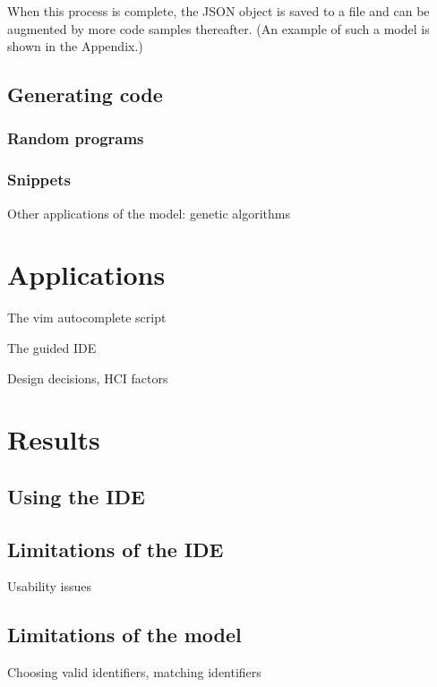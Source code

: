\documentclass{article}
\begin{document}
When this process is complete, the JSON object is saved to a file and can be augmented by more code samples thereafter. (An example of such a model is shown in the Appendix.)

\subsection{Generating code}

\subsubsection{Random programs}

\subsubsection{Snippets}



%

Other applications of the model: genetic algorithms

\section{Applications}

The vim autocomplete script

The guided IDE

Design decisions, HCI factors

\section{Results}

\subsection{Using the IDE}

\subsection{Limitations of the IDE}

Usability issues

\subsection{Limitations of the model}

Choosing valid identifiers, matching identifiers
\end{document}

